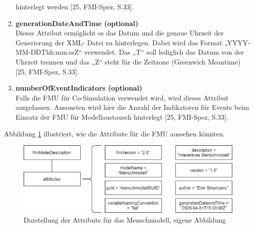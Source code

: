 \begin{enumerate}
	hinterlegt werden [25, FMI-Spez, S.33].
	\item \textbf{generationDateAndTime (optional)} \\
	Dieses Attribut ermöglicht es das Datum und die genaue Uhrzeit der Generierung der XML-
	Datei zu hinterlegen. Dabei wird das Format „YYYY-MM-DDThh:mm:ssZ“ verwendet. Das
	„T“ soll lediglich das Datum von der Uhrzeit trennen und das „Z“ steht für die Zeitzone
	(Greenwich Meantime) [25, FMI-Spez, S.33].
	\item \textbf{numberOfEventIndicators (optional)} \\
	Falls die FMU für Co-Simulation verwendet wird, wird dieses Attribut ausgelassen. Ansonsten
	wird hier die Anzahl der Indikatoren für Events beim Einsatz der FMU für Modellaustausch
	hinterlegt [25, FMI-Spez, S.33].
\end{enumerate}
Abbildung \ref{fig:FMUAttribute} illustriert, wie die Attribute für die FMU aussehen könnten.
\begin{figure}[h]
	\centering
	\includegraphics[width=1\linewidth]{Bilder/A24_FMUAttributBeispiel}
	\caption{Darstellung der Attribute für das Menschmodell, eigene Abbildung}
	\label{fig:FMUAttribute}
\end{figure}


